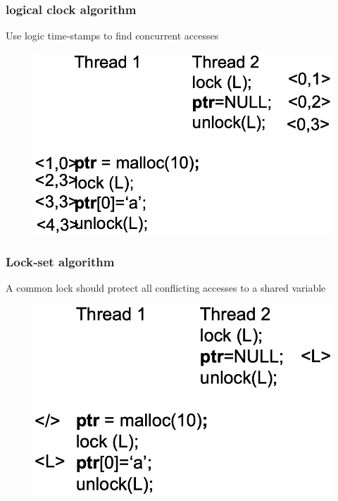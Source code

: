 % 
% 
% 
% 
% 
% 
\begin{frame}[fragile]
    \frametitle{logical clock algorithm}

Use logic time‐stamps to find concurrent accesses
\pause
    \begin{figure}
    \includegraphics[width=0.45\linewidth]{figs/Happen‐before.png}
    \end{figure}
\end{frame}
% 
% 
% 
% 
\begin{frame}[fragile]
    \frametitle{Lock‐set algorithm}

A common lock should protect all conflicting accesses to a shared variable
\pause
    \begin{figure}
    \includegraphics[width=0.5\linewidth]{figs/Lock‐set.png}
    \end{figure}
\end{frame}
